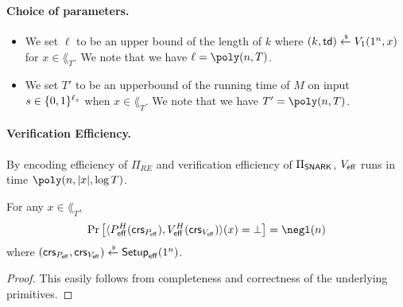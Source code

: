 \paragraph{Choice of parameters.}
\begin{itemize}
\item We set $\ell$ to be an upper bound of the length of $k$ where $(k,\mathsf{td})\overset{\hspace{0.1em}\mathsf{\scriptscriptstyle\$}}{\leftarrow} V_1(1^n,x)$ for $x\in \lang_T$. We note that we have $\ell=\poly(\secpar,T)$.
\item We set $T'$ to be an upperbound of the running time of $M$ on input $s\in \{0,1\}^{\ell_s}$ when $x\in \lang_T$. We note that we have $T'=\poly(\secpar,T)$.
\end{itemize}

\paragraph{Verification Efficiency.}
By encoding efficiency of $\Pi_{RE}$ and verification efficiency of $\Pi_{\mathsf{SNARK}}$, $V_{\mathsf{eff}}$ runs in time $\poly(\secpar,|x|,\log T)$.

\begin{theorem}[Completeness]\label{thm:eff_completeness}
For any $x\in \lang_T$, 
\begin{align*}
\Pr\left[\langle\proeff^{H}(\crs_{\proeff}),\vereff^H(\crs_{\vereff})\rangle(x)=\bot \right]=\negl(\secpar)    
\end{align*}
where $(\mathsf{crs}_{P_{\mathsf{eff}}},\mathsf{crs}_{V_{\mathsf{eff}}})\overset{\hspace{0.1em}\mathsf{\scriptscriptstyle\$}}{\leftarrow} \mathsf{Setup}_{\mathsf{eff}}(1^n)$.
\end{theorem}
\begin{proof}
This easily follows from completeness and correctness of the underlying primitives.
\end{proof}

